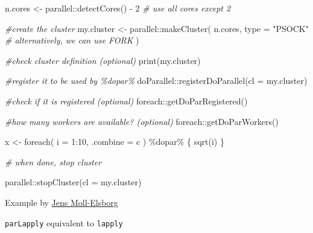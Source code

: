 \documentclass[
]{book}
\newenvironment{Shaded}{\begin{snugshade}}{\end{snugshade}}
\newcommand{\AttributeTok}[1]{\textcolor[rgb]{0.77,0.63,0.00}{#1}}
\newcommand{\CommentTok}[1]{\textcolor[rgb]{0.56,0.35,0.01}{\textit{#1}}}
\newcommand{\DecValTok}[1]{\textcolor[rgb]{0.00,0.00,0.81}{#1}}
\newcommand{\FunctionTok}[1]{\textcolor[rgb]{0.00,0.00,0.00}{#1}}
\newcommand{\NormalTok}[1]{#1}
\newcommand{\OtherTok}[1]{\textcolor[rgb]{0.56,0.35,0.01}{#1}}
\newcommand{\SpecialCharTok}[1]{\textcolor[rgb]{0.00,0.00,0.00}{#1}}
\newcommand{\StringTok}[1]{\textcolor[rgb]{0.31,0.60,0.02}{#1}}
\begin{document}
\begin{Shaded}
\begin{Highlighting}[]
\NormalTok{n.cores }\OtherTok{\textless{}{-}}\NormalTok{ parallel}\SpecialCharTok{::}\FunctionTok{detectCores}\NormalTok{() }\SpecialCharTok{{-}} \DecValTok{2} \CommentTok{\# use all cores except 2}

\CommentTok{\#create the cluster}
\NormalTok{my.cluster }\OtherTok{\textless{}{-}}\NormalTok{ parallel}\SpecialCharTok{::}\FunctionTok{makeCluster}\NormalTok{(}
\NormalTok{  n.cores, }
  \AttributeTok{type =} \StringTok{"PSOCK"} \CommentTok{\# alternatively, we can use FORK}
\NormalTok{  )}

\CommentTok{\#check cluster definition (optional)}
\FunctionTok{print}\NormalTok{(my.cluster)}

\CommentTok{\#register it to be used by \%dopar\%}
\NormalTok{doParallel}\SpecialCharTok{::}\FunctionTok{registerDoParallel}\NormalTok{(}\AttributeTok{cl =}\NormalTok{ my.cluster)}

\CommentTok{\#check if it is registered (optional)}
\NormalTok{foreach}\SpecialCharTok{::}\FunctionTok{getDoParRegistered}\NormalTok{()}

\CommentTok{\#how many workers are available? (optional)}
\NormalTok{foreach}\SpecialCharTok{::}\FunctionTok{getDoParWorkers}\NormalTok{()}

\NormalTok{x }\OtherTok{\textless{}{-}} \FunctionTok{foreach}\NormalTok{(}
  \AttributeTok{i =} \DecValTok{1}\SpecialCharTok{:}\DecValTok{10}\NormalTok{, }
  \AttributeTok{.combine =} \StringTok{\textquotesingle{}c\textquotesingle{}}
\NormalTok{) }\SpecialCharTok{\%dopar\%}\NormalTok{ \{}
    \FunctionTok{sqrt}\NormalTok{(i)}
\NormalTok{\}}

\CommentTok{\# when done, stop cluster}

\NormalTok{parallel}\SpecialCharTok{::}\FunctionTok{stopCluster}\NormalTok{(}\AttributeTok{cl =}\NormalTok{ my.cluster)}
\end{Highlighting}
\end{Shaded}

Example by \href{https://towardsdatascience.com/getting-started-with-parallel-programming-in-r-d5f801d43745}{Jens Moll-Elsborg}

\texttt{parLapply} equivalent to \texttt{lapply}
\end{document}
